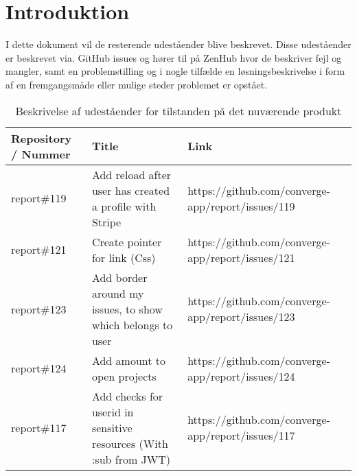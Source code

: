 \chapter{Introduktion}

I dette dokument vil de resterende udeståender blive beskrevet. Disse udeståender er beskrevet via. GitHub issues og hører til på ZenHub hvor de beskriver fejl og mangler, samt en problemstilling og i nogle tilfælde en løsningsbeskrivelse i form af en fremgangsmåde eller mulige steder problemet er opstået.

\begin{table}[H]
\centering
\begin{tabular}[c]{p{2cm}p{5cm}p{5cm}}
\textbf{Repository / Nummer} & \textbf{Title}                                                            & \textbf{Link}                                             \\\hline
report\#119       & Add reload after user has created a profile with Stripe           & https://github.com/converge-app/report/issues/119 \\\hline
report\#121       & Create pointer for link (Css)                                     & https://github.com/converge-app/report/issues/121 \\\hline
report\#123       & Add border around my issues, to show which belongs to user        & https://github.com/converge-app/report/issues/123 \\\hline
report\#124       & Add amount to open projects                                       & https://github.com/converge-app/report/issues/124 \\\hline
report\#117       & Add checks for userid in sensitive resources (With :sub from JWT) & https://github.com/converge-app/report/issues/117
\end{tabular}
\caption{Beskrivelse af udeståender for tilstanden på det nuværende produkt}
\label{tab:bugs}
\end{table}
